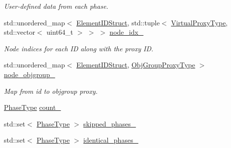 \begin{DoxyCompactItemize}
\begin{DoxyCompactList}\small\item\em User-\/defined data from each phase. \end{DoxyCompactList}\item 
std\+::unordered\+\_\+map$<$ \hyperlink{namespacevt_1_1vrt_1_1collection_1_1balance_a9f5b53fafb270212279a4757d2c4cd28}{Element\+I\+D\+Struct}, std\+::tuple$<$ \hyperlink{namespacevt_a1b417dd5d684f045bb58a0ede70045ac}{Virtual\+Proxy\+Type}, std\+::vector$<$ uint64\+\_\+t $>$ $>$ $>$ \hyperlink{structvt_1_1vrt_1_1collection_1_1balance_1_1_l_b_data_holder_a6b316a4e35ea98e592cbe875074aa6d8}{node\+\_\+idx\+\_\+}
\begin{DoxyCompactList}\small\item\em Node indices for each ID along with the proxy ID. \end{DoxyCompactList}\item 
std\+::unordered\+\_\+map$<$ \hyperlink{namespacevt_1_1vrt_1_1collection_1_1balance_a9f5b53fafb270212279a4757d2c4cd28}{Element\+I\+D\+Struct}, \hyperlink{namespacevt_ad7cae989df485fccca57f0792a880a8e}{Obj\+Group\+Proxy\+Type} $>$ \hyperlink{structvt_1_1vrt_1_1collection_1_1balance_1_1_l_b_data_holder_ab862d2f1b884256fc88634757f37bb80}{node\+\_\+objgroup\+\_\+}
\begin{DoxyCompactList}\small\item\em Map from id to objgroup proxy. \end{DoxyCompactList}\item 
\hyperlink{namespacevt_a46ce6733d5cdbd735d561b7b4029f6d7}{Phase\+Type} \hyperlink{structvt_1_1vrt_1_1collection_1_1balance_1_1_l_b_data_holder_ac7d4f40440b458c101af292dd3357558}{count\+\_\+}
\item 
std\+::set$<$ \hyperlink{namespacevt_a46ce6733d5cdbd735d561b7b4029f6d7}{Phase\+Type} $>$ \hyperlink{structvt_1_1vrt_1_1collection_1_1balance_1_1_l_b_data_holder_a66a5410c689d1515c9462495d3225a79}{skipped\+\_\+phases\+\_\+}
\item 
std\+::set$<$ \hyperlink{namespacevt_a46ce6733d5cdbd735d561b7b4029f6d7}{Phase\+Type} $>$ \hyperlink{structvt_1_1vrt_1_1collection_1_1balance_1_1_l_b_data_holder_a190018ee0726acb12d7d416476de5bfd}{identical\+\_\+phases\+\_\+}
\end{DoxyCompactItemize}
